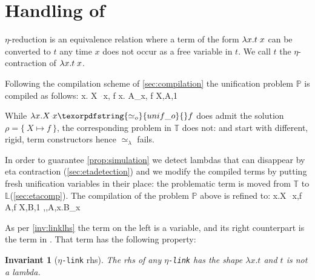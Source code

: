\documentclass[sigconf,natbib=false,review]{acmart}
\newtheorem{invariant}{Invariant}
\newcommand{\appsep}{\ensuremath{\textcolor{lightgray}{\cdot}}}
\newcommand{\UnifRel}{\ensuremath{\simeq}}
\newcommand{\Uo}{\texorpdfstring{\ensuremath{\UnifRel_o}\xspace}{unif\_o}}
\newcommand{\Ue}{\ensuremath{\UnifRel_\lambda}\xspace}
\newcommand{\linkMacro}[1]{\ensuremath{#1}\texttt{-link}\xspace}
\newcommand{\linketa} {\linkMacro{\eta}}
\newcommand{\rhs}{rhs\xspace}
\newcommand{\linkStore}{\texorpdfstring{\ensuremath{\mathbb{L}}\xspace}{L}}
\newcommand{\foUnifPb}{\ensuremath{\mathbb{P}}\xspace}
\newcommand{\hoUnifPb}{\ensuremath{\mathbb{T}}\xspace}
\begin{document}




\section{Handling of \maybeeta}\label{sec:eta}
$\eta$-reduction is an equivalence relation where a term of the form
$\lambda x.t \appsep x$ can be converted to $t$ any time $x$ does not occur as a
free variable in $t$. We call $t$ the $\eta$-contraction of
$\lambda x. t \appsep x$.

Following the compilation scheme of \cref{sec:compilation} the
unification problem \foUnifPb is compiled as follows:
%
\printAlll
  {{{\lambda x. X \appsep x, f}}}
  {{{\lambda x. A_x, f}}}
  {{{X,A,1}}}
  {{}}

\noindent
While $\lambda x.X \appsep x \Uo{} f$ does admit the solution
$\rho = \{~ X \mapsto f ~\}$, the corresponding problem in
\hoUnifPb does not:
 and
 start with different, rigid, term constructors hence
\Ue{} fails.

In order to guarantee \cref{prop:simulation} we detect
lambdas that can disappear by eta contraction (\cref{sec:etadetection}) and
we modify the compiled terms by putting fresh unification variables
in their place: the problematic term is moved 
from  \hoUnifPb to \linkStore (\cref{sec:etacomp}). The compilation
of the problem \foUnifPb above is refined to: 
%
\printAlll
  {{{\lambda x.X \appsep x,f}}}
  {{{A,f}}}
  {{{X,B,1}}}
  {{{\eta,,A,\lambda x.B_x}}}

\noindent
As per \cref{inv:linklhs} the term on the left is a variable, and its
right counterpart is the
term in \maybeeta. That term has the following property:

\begin{invariant}[\linketa \rhs]
  The \rhs of any \linketa %
  has the shape $\lambda x.t$
  and $t$ is not a lambda. 
  \label{inv:link-eta-right}
\end{invariant}
\end{document}
